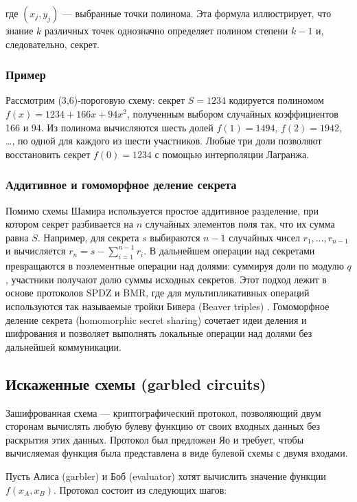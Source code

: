 где \((x_j, y_j)\) --- выбранные точки полинома.  Эта формула иллюстрирует, что знание \(k\) различных точек однозначно определяет полином степени \(k-1\) и, следовательно, секрет.

\subsubsection{Пример}

Рассмотрим (3,6)-пороговую схему: секрет \(S=1234\) кодируется полиномом \(f(x)=1234+166x+94x^2\), полученным выбором случайных коэффициентов 166 и 94. Из полинома вычисляются шесть долей \(f(1)=1494\), \(f(2)=1942\), \ldots, по одной для каждого из шести участников. Любые три доли позволяют восстановить секрет \(f(0)=1234\) с помощью интерполяции Лагранжа.

\subsubsection{Аддитивное и гомоморфное деление секрета}

Помимо схемы Шамира используется простое аддитивное разделение, при котором секрет разбивается на \(n\) случайных элементов поля так, что их сумма равна \(S\).  Например, для секрета \(s\) выбираются \(n-1\) случайных чисел \(r_1,\ldots,r_{n-1}\) и вычисляется \(r_n = s - \sum_{i=1}^{n-1} r_i\).  В дальнейшем операции над секретами превращаются в поэлементные операции над долями: суммируя доли по модулю \(q\), участники получают долю суммы исходных секретов.  Этот подход лежит в основе протоколов SPDZ и BMR, где для мультипликативных операций используются так называемые тройки Бивера (Beaver triples) \cite{06}.  Гомоморфное деление секрета (homomorphic secret sharing) сочетает идеи деления и шифрования и позволяет выполнять локальные операции над долями без дальнейшей коммуникации.

\subsection{Искаженные схемы (garbled circuits)}

Зашифрованная схема --- криптографический протокол, позволяющий двум сторонам вычислять любую булеву функцию от своих входных данных без раскрытия этих данных.  Протокол был предложен Яо и требует, чтобы вычисляемая функция была представлена в виде булевой схемы с двумя входами.

Пусть Алиса (garbler) и Боб (evaluator) хотят вычислить значение функции \(f(x_A, x_B)\).  Протокол состоит из следующих шагов:

